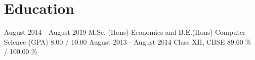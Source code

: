 \section{Education}\label{sec:education}
\resumeSubHeadingListStart
{} {August 2014 - August 2019} {M.Sc. (Hons) Economics and B.E.(Hons) Computer Science} {(GPA) 8.00 / 10.00}
 {August 2013 - August 2014} {Class XII, CBSE} {89.60 \% / 100.00 \%}
\resumeSubHeadingListEnd